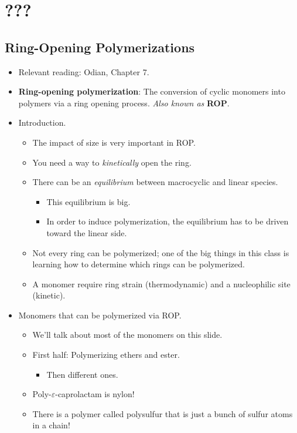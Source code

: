 \documentclass[../notes.tex]{subfiles}
\begin{document}
\chapter{???}
\section{Ring-Opening Polymerizations}
\begin{itemize}
    \item {}Relevant reading: Odian, Chapter 7.
    \item \textbf{Ring-opening polymerization}: The conversion of cyclic monomers into polymers via a ring opening process. \emph{Also known as} \textbf{ROP}.
    \item Introduction.
    \begin{itemize}
        \item The impact of size is very important in ROP.
        \item You need a way to \emph{kinetically} open the ring.
        \item There can be an \emph{equilibrium} between macrocyclic and linear species.
        \begin{itemize}
            \item This equilibrium is big.
            \item In order to induce polymerization, the equilibrium has to be driven toward the linear side.
        \end{itemize}
        \item Not every ring can be polymerized; one of the big things in this class is learning how to determine which rings can be polymerized.
        \item A monomer require ring strain (thermodynamic) and a nucleophilic site (kinetic).
    \end{itemize}
    \item Monomers that can be polymerized via ROP.
    \begin{itemize}
        \item We'll talk about most of the monomers on this slide.
        \item First half: Polymerizing ethers and ester.
        \begin{itemize}
            \item Then different ones.
        \end{itemize}
        \item Poly-$\varepsilon$-caprolactam is nylon!
        \item There is a polymer called polysulfur that is just a bunch of sulfur atoms in a chain!

\end{itemize}
\end{itemize}
\end{document}
